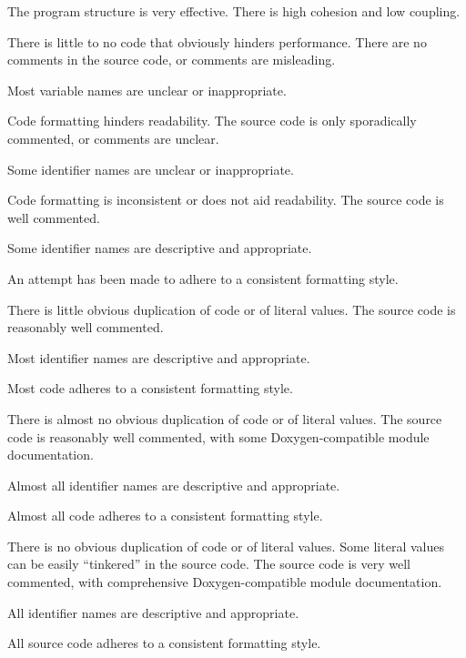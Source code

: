 \documentclass{../fal_assignment}
\begin{document}
\begin{markingrubric}
            \par The program structure is very effective. There is high cohesion and low coupling.
            \par There is little to no code that obviously hinders performance.
%
        \grade\fail There are no comments in the source code, or comments are misleading.
            \par Most variable names are unclear or inappropriate.
            \par Code formatting hinders readability.
        \grade The source code is only sporadically commented, or comments are unclear.
            \par Some identifier names are unclear or inappropriate.
            \par Code formatting is inconsistent or does not aid readability.
        \grade The source code is well commented.
            \par Some identifier names are descriptive and appropriate.
            \par An attempt has been made to adhere to a consistent formatting style.
             \par There is little obvious duplication of code or of literal values.           
        \grade The source code is reasonably well commented.
            \par Most identifier names are descriptive and appropriate.
            \par Most code adheres to a consistent formatting style.
             \par There is almost no obvious duplication of code or of literal values.   
        \grade The source code is reasonably well commented, with some Doxygen-compatible module documentation.
            \par Almost all identifier names are descriptive and appropriate.
            \par Almost all code adheres to a consistent formatting style.
             \par There is no obvious duplication of code or of literal values. Some literal values can be easily ``tinkered'' in the source code. 
        \grade The source code is very well commented, with comprehensive Doxygen-compatible module documentation.
            \par All identifier names are descriptive and appropriate.
            \par All source code adheres to a consistent formatting style.

\end{markingrubric}
\end{document}
